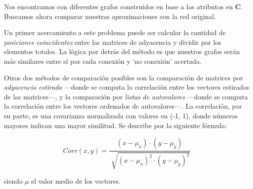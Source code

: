
Nos encontramos con diferentes grafos construidos en base a los atributos en \textbf{C}. Buscamos ahora comparar nuestras aproximaciones con la red original. 

\vspace{1em}
Un primer acercamiento a este problema puede ser calcular la cantidad de \textit{posiciones coincidentes} entre las matrices de adyacencia y dividir por los elementos totales. La lógica por detrás del método es que nuestros grafos serán más similares entre sí por cada conexión y `no conexión' acertada. %

Otros dos métodos de comparación posibles son la comparación de matrices por \textit{adyacencia estirada} ---donde se computa la correlación entre los vectores estirados de las matrices---, y la comparación por \textit{listas de autovalores} ---donde se computa la correlación entre los vectores ordenados de autovalores---. La correlación, por su parte, es una covarianza normalizada con valores en (-1, 1), donde números mayores indican una mayor similitud. Se describe por la siguiente fórmula:

\vspace{1em}
\begin{equation}
    Corr(x, y) = \frac{(x - \mu_{x}) \cdot (y - \mu_{y})}{\sqrt[]{(x - \mu_{x})^{2} \cdot (y - \mu_{y})^{2}}}
    \label{eq:corr}
\end{equation}

\vspace{1em}
\noindent siendo $\mu$ el valor medio de los vectores.


